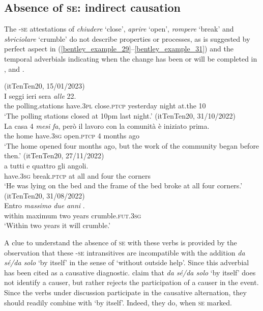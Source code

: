 \documentclass[output=paper,colorlinks,citecolor=brown
]{langscibook}
\begin{document}
\subsection{Absence of \textsc{se}: indirect causation}
\label{bentley_section_4.2}
The -\textsc{se} attestations of \textit{chiudere} ‘close’, \textit{aprire} ‘open’, \textit{rompere} ‘break’ and \textit{sbriciolare} ‘crumble’ do not describe properties or processes, as is suggested by perfect aspect in (\ref{bentley_example_29}--\ref{bentley_example_31}) and the temporal adverbials indicating when the change has been or will be completed in ,  and .

\ea \label{bentley_example_29}(itTenTen20, 15/01/2023)\\
    \gll I			seggi													 				ieri 						sera 		\textit{alle}		22. \\
    the	polling.stations	have.3\textsc{pl}	close.\textsc{ptcp}		yesterday	night	at.the	10 \\
    \glt 	‘The polling stations closed at 10pm last night.’
\ex \label{bentley_example_30}(itTenTen20, 31/10/2022)\\
    \gll La		casa													4	\textit{mesi}				\textit{fa}, {però il lavoro con la comunità è iniziato prima.}\\
    			the		home		have.3\textsc{sg}	open.\textsc{ptcp}	4	months	ago {} \\
    \glt 				‘The home opened four months ago, but the work of the community began before then.’
\ex \label{bentley_example_31}(itTenTen20, 27/11/2022)\\
     												a		tutti	e				quattro 	gli 	angoli.  \\
    	{} 	have.3\textsc{sg}	break.\textsc{ptcp}	at	all		and	four				the	corners\\
    \glt 				‘He was lying on the bed and the frame of the bed broke at all four corners.’
\ex \label{bentley_example_32}(itTenTen20, 31/08/2022)\\
    \gll Entro		\textit{massimo}			\textit{due}	\textit{anni}		. \\
    	within	maximum		two	years	crumble.\textsc{fut}.3\textsc{sg} \\
    \glt 				‘Within two years it will crumble.’
\z

A clue to understand the absence of \textsc{se} with these verbs is provided by the observation that these -\textsc{se} intransitives are incompatible with the addition \textit{da sé/da solo} ‘by itself’ in the sense of ‘without outside help’. Since \citet{chierchia1989semantics} this adverbial has been cited as a causative diagnostic. \citet[76--79]{alexiadou2015external}  claim that\textit{ da sé/da solo} ‘by itself’ does not identify a causer, but rather rejects the participation of a causer in the event. Since the verbs under discussion participate in the causative alternation, they should readily combine with ‘by itself’. Indeed, they do, when \textsc{se} marked.
\end{document}
